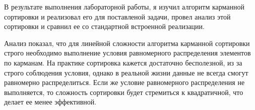 \documentclass[12pt]{article}
\begin{document}
В результате выполнения лабораторной работы, я изучил алгоритм карманной сортировки и реализовал его для поставленой задачи, провел анализ этой сортировки и сравнил ее со стандартной встроенной реализации.

Анализ показал, что для линейной сложности алгоритма карманной сортировки строго необходимо выполнение условия равномерного распределения элементов по карманам. На практике сортировка кажется достаточно бесполезной, из за строго соблюдения условия, однако в реальной жизни данные не всегда смогут равномерно распределиться. Если же условие равномерного распределения не выполняется, то сложность сортировки будет стремиться к квадратичной, что делает ее менее эффективной.
\end{document}
